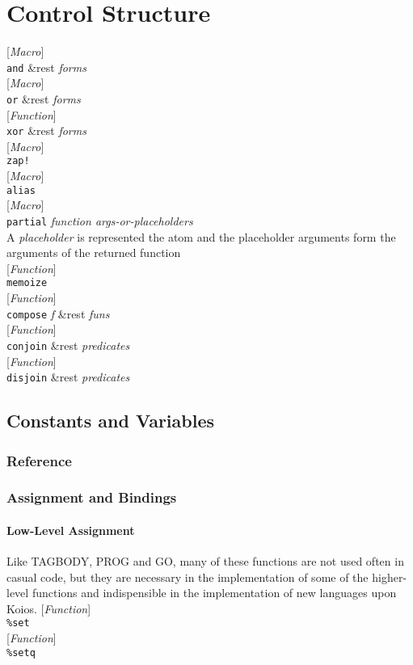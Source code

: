 \documentclass[10pt]{book}
\newenvironment{defother}[2]{[\textit{#1}]\\\texttt{#2}}{\\}
\newenvironment{defun}[1]{\begin{defother}{Function}{#1}}{\end{defother}}
\newenvironment{defmacro}[1]{\begin{defother}{Macro}{#1}}{\end{defother}}
\begin{document}
\chapter{Control Structure}
\begin{defmacro}{and} \&rest \textit{forms}\end{defmacro}
\begin{defmacro}{or} \&rest \textit{forms}\end{defmacro}
\begin{defun}{xor} \&rest \textit{forms}\end{defun}
\begin{defmacro}{zap!}\end{defmacro} %
\begin{defmacro}{alias}\end{defmacro} %
\begin{defmacro}{partial} \textit{function args-or-placeholders}\\
A \textit{placeholder} is represented the atom \texttt{\textunderscore} and the placeholder arguments form the arguments of the returned function\end{defmacro}
\begin{defun}{memoize}\end{defun}
\begin{defun}{compose} \textit{f} \&rest \textit{funs} \end{defun}
\begin{defun}{conjoin} \&rest \textit{predicates}\end{defun}
\begin{defun}{disjoin} \&rest \textit{predicates}\end{defun}
\section{Constants and Variables}
\subsection{Reference}
\subsection{Assignment and Bindings}
\subsubsection{Low-Level Assignment}
Like TAGBODY, PROG and GO, many of these functions are not used often in casual code, but they are necessary in the implementation of some of the higher-level functions and indispensible in the implementation of new languages upon Koios. 
\begin{defun}{\%set}\end{defun}%
\begin{defun}{\%setq}\end{defun}
\end{document}
